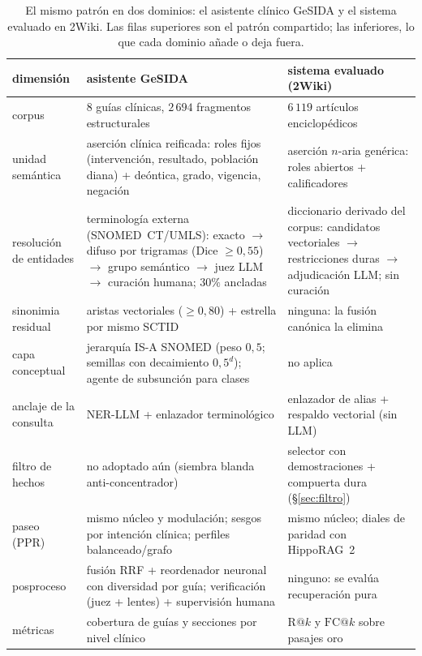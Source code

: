 \documentclass[11pt,a4paper]{article}
\newcommand{\hippo}{HippoRAG~2}
\begin{document}
\begin{table}[t]
\centering\footnotesize\setlength{\tabcolsep}{3.5pt}
\caption{El mismo patrón en dos dominios: el asistente clínico GeSIDA y el
sistema evaluado en 2Wiki. Las filas superiores son el patrón compartido;
las inferiores, lo que cada dominio añade o deja fuera.}
\label{tab:gesida-wiki}
\begin{tabular}{p{}p{}p{}}
\toprule
dimensión & asistente GeSIDA & sistema evaluado (2Wiki)\\
\midrule
corpus & 8 guías clínicas, $2\,694$ fragmentos estructurales & $6\,119$
  artículos enciclopédicos\\
unidad semántica & aserción clínica reificada: roles fijos
  (intervención, resultado, población diana) + deóntica, grado, vigencia,
  negación & aserción $n$-aria genérica: roles abiertos + calificadores\\
resolución de entidades & terminología externa (SNOMED~CT/UMLS):
  exacto $\to$ difuso por trigramas (Dice $\ge 0{,}55$) $\to$ grupo
  semántico $\to$ juez LLM $\to$ curación humana; $30\%$ ancladas &
  diccionario derivado del corpus: candidatos vectoriales $\to$
  restricciones duras $\to$ adjudicación LLM; sin curación\\
sinonimia residual & aristas vectoriales ($\ge 0{,}80$) + estrella por
  mismo SCTID & ninguna: la fusión canónica la elimina\\
capa conceptual & jerarquía IS-A SNOMED (peso $0{,}5$; semillas con
  decaimiento $0{,}5^{d}$); agente de subsunción para clases & no aplica\\
anclaje de la consulta & NER-LLM + enlazador terminológico & enlazador de
  alias + respaldo vectorial (sin LLM)\\
filtro de hechos & no adoptado aún (siembra blanda anti-concentrador) &
  selector con demostraciones + compuerta dura (\S\ref{sec:filtro})\\
paseo (PPR) & mismo núcleo y modulación; sesgos por intención clínica;
  perfiles balanceado/grafo & mismo núcleo; diales de paridad con
  \hippo{}\\
posproceso & fusión RRF + reordenador neuronal con diversidad por guía;
  verificación (juez + lentes) + supervisión humana & ninguno: se evalúa
  recuperación pura\\
métricas & cobertura de guías y secciones por nivel clínico & $\mathrm{R@}k$
  y $\mathrm{FC@}k$ sobre pasajes oro\\
\bottomrule
\end{tabular}
\end{table}
\end{document}
